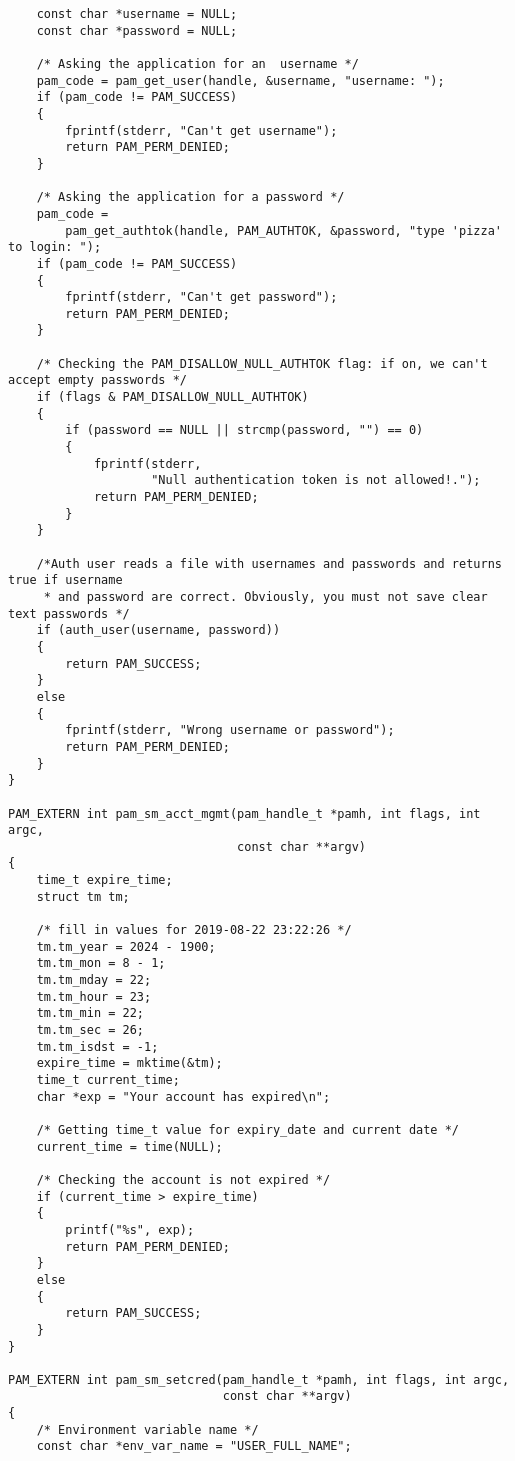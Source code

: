 \begin{lstlisting}
    const char *username = NULL;
    const char *password = NULL;

    /* Asking the application for an  username */
    pam_code = pam_get_user(handle, &username, "username: ");
    if (pam_code != PAM_SUCCESS)
    {
        fprintf(stderr, "Can't get username");
        return PAM_PERM_DENIED;
    }

    /* Asking the application for a password */
    pam_code =
        pam_get_authtok(handle, PAM_AUTHTOK, &password, "type 'pizza' to login: ");
    if (pam_code != PAM_SUCCESS)
    {
        fprintf(stderr, "Can't get password");
        return PAM_PERM_DENIED;
    }

    /* Checking the PAM_DISALLOW_NULL_AUTHTOK flag: if on, we can't accept empty passwords */
    if (flags & PAM_DISALLOW_NULL_AUTHTOK)
    {
        if (password == NULL || strcmp(password, "") == 0)
        {
            fprintf(stderr,
                    "Null authentication token is not allowed!.");
            return PAM_PERM_DENIED;
        }
    }

    /*Auth user reads a file with usernames and passwords and returns true if username
     * and password are correct. Obviously, you must not save clear text passwords */
    if (auth_user(username, password))
    {
        return PAM_SUCCESS;
    }
    else
    {
        fprintf(stderr, "Wrong username or password");
        return PAM_PERM_DENIED;
    }
}

PAM_EXTERN int pam_sm_acct_mgmt(pam_handle_t *pamh, int flags, int argc,
                                const char **argv)
{
    time_t expire_time;
    struct tm tm;

    /* fill in values for 2019-08-22 23:22:26 */
    tm.tm_year = 2024 - 1900;
    tm.tm_mon = 8 - 1;
    tm.tm_mday = 22;
    tm.tm_hour = 23;
    tm.tm_min = 22;
    tm.tm_sec = 26;
    tm.tm_isdst = -1;
    expire_time = mktime(&tm);
    time_t current_time;
    char *exp = "Your account has expired\n";

    /* Getting time_t value for expiry_date and current date */
    current_time = time(NULL);

    /* Checking the account is not expired */
    if (current_time > expire_time)
    {
        printf("%s", exp);
        return PAM_PERM_DENIED;
    }
    else
    {
        return PAM_SUCCESS;
    }
}

PAM_EXTERN int pam_sm_setcred(pam_handle_t *pamh, int flags, int argc,
                              const char **argv)
{
    /* Environment variable name */
    const char *env_var_name = "USER_FULL_NAME";


\end{lstlisting}
